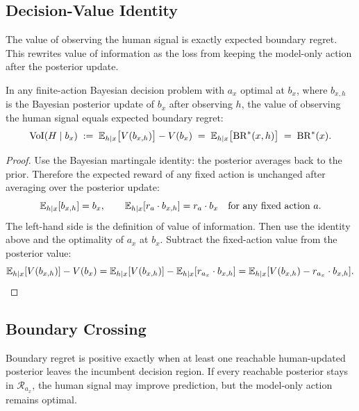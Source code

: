 \subsection{Decision-Value Identity}
The value of observing the human signal is exactly expected boundary regret.
This rewrites value of information as the loss from keeping the model-only action after the posterior update.

\begin{theorem}\label{thm:voi-br}
In any finite-action Bayesian decision problem with $a_x$ optimal at $b_x$, where $b_{x,h}$ is the Bayesian posterior update of $b_x$ after observing $h$, the value of observing the human signal equals expected boundary regret:
\begin{equation}
    \operatorname{VoI}(H \mid b_x)
    \;:=\; \mathbb{E}_{h \mid x}\bigl[V(b_{x,h})\bigr] - V(b_x)
    \;=\; \mathbb{E}_{h \mid x}\bigl[\operatorname{BR}^{*}(x, h)\bigr]
    \;=\; \operatorname{BR}^{*}(x).
\label{eq:voi-br}
\end{equation}
\end{theorem}
\vspace{-1.25em}
\begin{proof}
Use the Bayesian martingale identity: the posterior averages back to the prior.
Therefore the expected reward of any fixed action is unchanged after averaging over the posterior update:
\[
    \mathbb{E}_{h \mid x}[b_{x,h}] = b_x,
    \qquad
    \mathbb{E}_{h \mid x}[r_a \cdot b_{x,h}] = r_a \cdot b_x
    \quad\text{for any fixed action } a.
\]
The left-hand side is the definition of value of information.
Then use the identity above and the optimality of $a_x$ at $b_x$.
Subtract the fixed-action value from the posterior value:
\[
    \mathbb{E}_{h \mid x}[V(b_{x,h})] - V(b_x)
    =
    \mathbb{E}_{h \mid x}[V(b_{x,h})] - \mathbb{E}_{h \mid x}[r_{a_x} \cdot b_{x,h}]
    =
    \mathbb{E}_{h \mid x}[V(b_{x,h}) - r_{a_x} \cdot b_{x,h}].
    \qedhere
\]
\end{proof}

\subsection{Boundary Crossing}
Boundary regret is positive exactly when at least one reachable human-updated posterior leaves the incumbent decision region.
If every reachable posterior stays in $\mathcal{R}_{a_x}$, the human signal may improve prediction, but the model-only action remains optimal.

